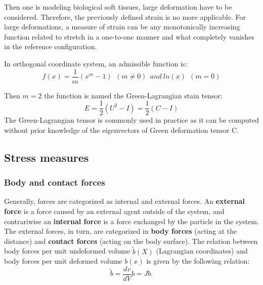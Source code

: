Then one is modeling biological soft tissues, large deformation have to be considered. Therefore, the previously defined strain is no more applicable. For large deformations, a measure of strain can be any monotonically increasing function related to stretch in a one-to-one manner and what completely vanishes in the reference configuration.

In orthogonal coordinate system, an admissible function is:
\begin{equation}
f(x) = \frac{1}{m}(x^m-1) \ \ (m \neq 0)\  \ and \ ln(x) \ \ (m=0)
\end{equation}   

Then $m=2$ the function is named the Green-Lagrangian stain tensor: 
\begin{equation}
E = \frac{1}{2}(U^2-I) =  \frac{1}{2}(C-I)
\end{equation}
The Green-Lagrangian tensor is commonly used in practice as it can be computed without prior knowledge of the eigenvectors of Green deformation tensor C.
%

\subsection{Stress measures}%

\subsubsection*{Body and contact forces}\label{bodycontactforces}
Generally, forces are categorized as internal and external forces. An \textbf{external force } is a force caused by an external agent outside of the system, and contrariwise an \textbf{internal force} is a force exchanged by the particle in the system. The external forces, in turn, are categorized in \textbf{body forces} (acting at the distance) and \textbf{contact forces} (acting on the body surface). The relation between body forces per unit undeformed volume $\tilde{b}(X)$ (Lagrangian coordinates) and body forces per unit deformed volume $b(x)$ is given by the following relation:
\begin{equation}
\tilde{b} = \frac{dv}{dV} b = Jb.
\end{equation}

